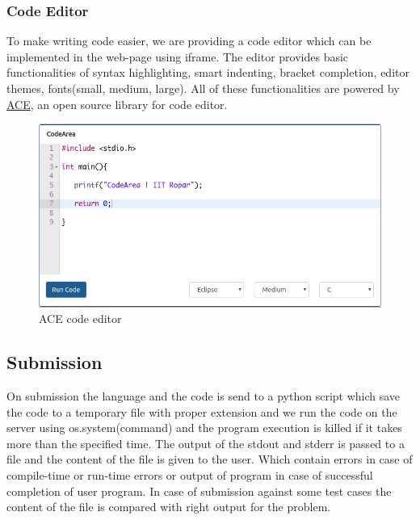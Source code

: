 \subsubsection{Code Editor}
To make writing code easier, we are providing a code editor which can be implemented in the web-page using iframe. The editor provides basic functionalities of syntax highlighting, smart indenting, bracket completion, editor themes, fonts(small, medium, large).
All of these functionalities are powered by \href{https://ace.c9.io/}{ACE}, an open source library for code editor.
\begin{figure}[h!]
    \centering
    \includegraphics[width=0.8\linewidth]{sample_code_editor.png}
    \caption{ACE code editor}
    \label{fig:code_editor}
\end{figure}


\vspace{1.4cm}

\subsection{Submission}
On submission the language and the code is send to a python script which save the code to a temporary file with proper extension and we run the code on the server using os.system(command) and the program execution is killed if it takes more than the specified time. The output of the stdout and stderr is passed to a file and the content of the file is given to the user. Which contain errors in case of compile-time or run-time errors or output of program in case of successful completion of user program.
In case of submission against some test cases the content of the file is compared with right output for the problem.
